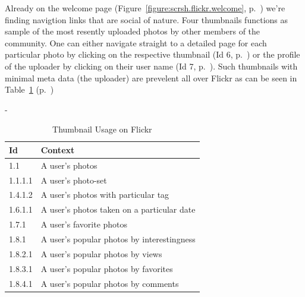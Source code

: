 Already on the welcome page (Figure~\ref{figure:scrsh.flickr.welcome},
p.~\pageref{figure:scrsh.flickr.welcome})
we're finding navigtion links that are social of
nature. Four thumbnails functions as sample of the most resently uploaded
photos by other members of the community. One can either navigate straight to
a detailed page for each particular photo by clicking on the respective
thumbnail (Id 6, p.~\pageref{table:flickr.content.inventory.6})
or the profile of the uploader by clicking on their user
name (Id 7, p.~\pageref{table:flickr.content.inventory.7}). Such thumbnails
with minimal meta data (the uploader) are prevelent all over Flickr as can be
seen in
Table~\ref{table:flickr.thumbnail.usage}
(p.~\pageref{table:flickr.thumbnail.usage})

\begin{table}
  \centering
  \strictpagechecktrue
  \begin{adjustwidth*}{0em}{-\wholemargin}
    \caption{Thumbnail Usage on Flickr}
    \label{table:flickr.thumbnail.usage}

    \begin{center}
      \begin{tabular}{ll}

        \toprule
        Id & Context \\
        \midrule

        1.1 &
        A user's photos \\

        1.1.1.1 &
        A user's photo-set \\

        1.4.1.2 &
        A user's photos with particular tag \\

        1.6.1.1 &
        A user's photos taken on a particular date \\

        1.7.1 &
        A user's favorite photos \\

        1.8.1 &
        A user's popular photos by interestingness \\

        1.8.2.1 &
        A user's popular photos by views \\

        1.8.3.1 &
        A user's popular photos by favorites \\

        1.8.4.1 &
        A user's popular photos by comments \\


\end{tabular}
\end{center}
\end{adjustwidth*}
\end{table}

